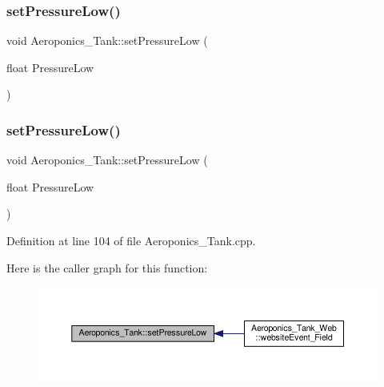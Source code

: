 \subsubsection{\texorpdfstring{set\+Pressure\+Low()}{setPressureLow()}\hspace{0.1cm}{\footnotesize\ttfamily [1/2]}}
{\footnotesize\ttfamily void Aeroponics\+\_\+\+Tank\+::set\+Pressure\+Low (\begin{DoxyParamCaption}\item[{float}]{Pressure\+Low }\end{DoxyParamCaption})\hspace{0.3cm}{\ttfamily [protected]}}

\mbox{\label{class_aeroponics___tank_a336c8e22072118cd60d912b28df660fb}} 
\subsubsection{\texorpdfstring{set\+Pressure\+Low()}{setPressureLow()}\hspace{0.1cm}{\footnotesize\ttfamily [2/2]}}
{\footnotesize\ttfamily void Aeroponics\+\_\+\+Tank\+::set\+Pressure\+Low (\begin{DoxyParamCaption}\item[{float}]{Pressure\+Low }\end{DoxyParamCaption})\hspace{0.3cm}{\ttfamily [protected]}}



Definition at line 104 of file Aeroponics\+\_\+\+Tank.\+cpp.

Here is the caller graph for this function\+:
\nopagebreak
\begin{figure}[H]
\begin{center}
\leavevmode
\includegraphics[width=350pt]{class_aeroponics___tank_a336c8e22072118cd60d912b28df660fb_icgraph}
\end{center}
\end{figure}
\mbox{\label{class_aeroponics___tank_ab4158b1a54f6a1ac4f3eb35fc8854e35}} 
